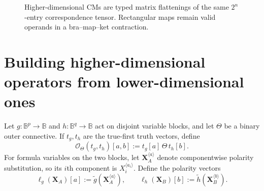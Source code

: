 \documentclass[11pt]{article}
\theoremstyle{definition}
\theoremstyle{remark}
\newcommand{\B}{\mathbb B}
\newcommand{\cC}{\mathcal C}
\newcommand{\cO}{\mathcal O}
\begin{document}
\begin{figure}[ht]
\centering
{}
\caption{Higher-dimensional CMs are typed matrix flattenings of the same $2^n$-entry correspondence tensor.  Rectangular maps remain valid operands in a bra--map--ket contraction.}
\label{fig:flattening}
\end{figure}

\section{Building higher-dimensional operators from lower-dimensional ones}
\label{sec:blocklift}

Let $g:\B^p\to\B$ and $h:\B^q\to\B$ act on disjoint variable blocks, and let $\Theta$ be a binary outer connective.  If $t_g,t_h$ are the true-first truth vectors, define
\begin{equation}
 \cO_\Theta(t_g,t_h)[a,b]:=t_g[a]\,\Theta\,t_h[b].
 \label{eq:outerlift}
\end{equation}
For formula variables on the two blocks, let $\mathbf X_A^{\langle a\rangle}$ denote componentwise polarity substitution, so its $i$th component is $X_i^{\langle a_i\rangle}$.  Define the polarity vectors
\begin{equation}
 \ell_g(\mathbf X_A)[a]:=\widetilde g(\mathbf X_A^{\langle a\rangle}),\qquad
 \ell_h(\mathbf X_B)[b]:=\widetilde h(\mathbf X_B^{\langle b\rangle}).
 \label{eq:polarityvectors}
\end{equation}
\end{document}
